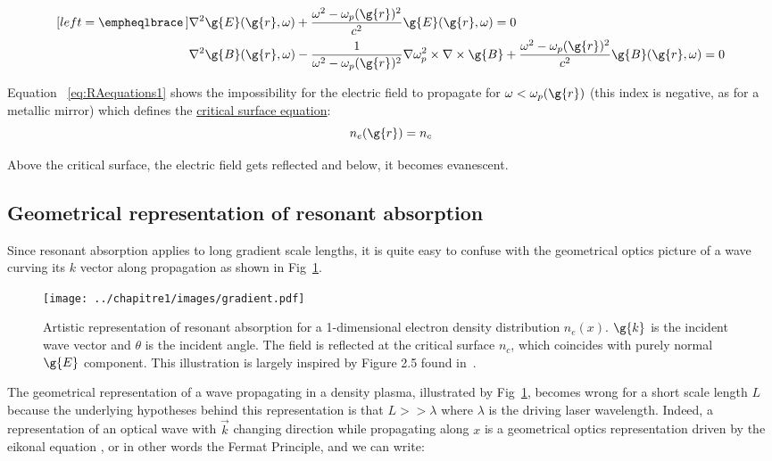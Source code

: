\begin{subequations}
\label{eq:RAequations}
\begin{align}[left = \empheqlbrace\,]
     &\nabla^2 \g{E}(\g{r},\omega) +  \frac{\omega^2-\omega_p(\g{r})^2}{c^2}\g{E}(\g{r},\omega)=0 \label{eq:RAequations1}\\
     &\nabla^2 \g{B}(\g{r},\omega) - \frac{1}{\omega^2-\omega_p(\g{r})^2}\nabla \omega_p^2 \times \nabla\times \g{B}+ \frac{\omega^2-\omega_p(\g{r})^2}{c^2} \g{B}(\g{r},\omega) =0 \label{eq:RAequations2}
\end{align}
\end{subequations}

\noindent Equation ~\ref{eq:RAequations1} shows the impossibility for the electric field to propagate for $\omega < \omega_p(\g{r})$ (this index is negative, as for a metallic mirror) which defines the \underline{critical surface equation}:
$$
n_e(\g{r})=n_c
$$ 

\noindent Above the critical surface, the electric field gets reflected and below, it becomes evanescent.

\subsection{Geometrical representation of resonant absorption}

Since resonant absorption applies to long gradient scale lengths, it is quite easy to confuse with the geometrical optics picture of a wave curving its $k$ vector along propagation as shown in Fig~\ref{fig:gradient}.

\begin{figure}[H]
\begin{center}
\texttt{[image: ../chapitre1/images/gradient.pdf]}\\
\caption{\label{fig:gradient} Artistic representation of resonant absorption for a 1-dimensional electron density distribution $n_e(x)$. $\g{k}$ is the incident wave vector and $\theta$ is the incident angle. The field is reflected at the critical surface $n_c$, which coincides with purely normal $\g{E}$ component. This illustration is largely inspired by Figure 2.5 found in~\cite{theseAnto}.}
\end{center}
\end{figure}

\noindent The geometrical representation of a wave propagating in a density plasma, illustrated by Fig~\ref{fig:gradient}, becomes wrong for a short scale length $L$ because the underlying hypotheses behind this representation is that $L >> \lambda$ where $\lambda$ is the driving laser wavelength. Indeed, a representation of an optical wave with $\vec{k}$ changing direction while propagating along $x$ is a geometrical optics representation driven by the eikonal equation \cite{LandauLip}, or in other words the Fermat Principle, and we can write:

